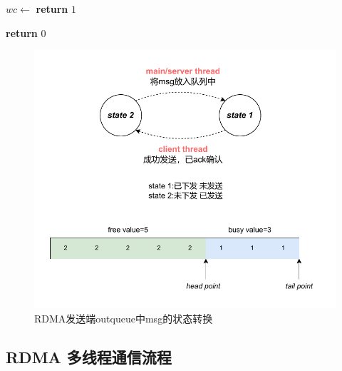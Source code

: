 {\begin{algorithm}
\begin{algorithmic}[1]
            \State
            \State $wc \gets$ 
                \State \textbf{return} $1$
            \EndIf

            \State
            \State {}
            \State \textbf{return} $0$
        \EndFunction
    \end{algorithmic}
\end{algorithm}

\begin{figure}[H]
    \centering
    \includegraphics[width=1.0\textwidth]{Img/send_state.drawio.pdf}
    \caption{RDMA发送端outqueue中msg的状态转换}
\end{figure}


\newpage
\subsection{RDMA 多线程通信流程}

}

